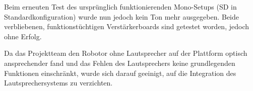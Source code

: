 Beim erneuten Test des ursprünglich funktionierenden Mono-Setups (SD in Standardkonfiguration) wurde nun jedoch kein Ton mehr ausgegeben. 
Beide verbliebenen, funktionstüchtigen Verstärkerboards sind getestet worden, jedoch ohne Erfolg.

Da das Projektteam den Robotor ohne Lautsprecher auf der Plattform optisch ansprechender fand und das Fehlen des Lautsprechers keine grundlegenden Funktionen einschränkt, wurde sich darauf geeinigt, auf die Integration des Lautsprechersystems zu verzichten. 

